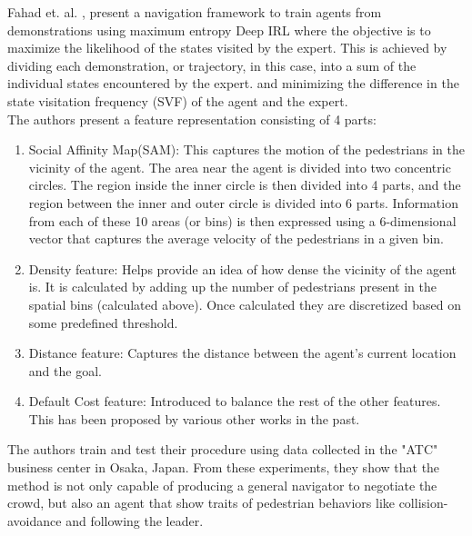 Fahad et. al. \cite{fahad_learning_2018}, present a navigation framework to train agents from demonstrations using maximum entropy Deep IRL where the objective is to maximize the likelihood of the states visited by the expert.
This is achieved by dividing each demonstration, or trajectory, in this case, into a sum of the individual states encountered by the expert. and minimizing the difference in the state visitation frequency (SVF) of the agent and the expert.\\
The authors present a feature representation consisting of 4 parts:
\begin{enumerate}
    \item Social Affinity Map(SAM): This captures the motion of the pedestrians in the vicinity of the agent. The area near the agent is divided into two concentric circles. The region inside the inner circle is then divided into 4 parts, and the region between the inner and outer circle is divided into 6 parts.
    Information from each of these 10 areas (or bins) is then expressed using a 6-dimensional vector that captures the average velocity of the pedestrians in a given bin. 
    \item Density feature: Helps provide an idea of how dense the vicinity of the agent is. It is calculated by adding up the number of pedestrians present in the spatial bins (calculated above). Once calculated they are discretized based on some predefined threshold.
    \item Distance feature: Captures the distance between the agent's current location and the goal.
    \item Default Cost feature: Introduced to balance the rest of the other features. This has been proposed by various other works in the past.
    
\end{enumerate}
The authors train and test their procedure using data collected in the "ATC" business center in Osaka, Japan.
From these experiments, they show that the method is not only capable of producing a general navigator to negotiate the crowd, but also an agent that show traits of pedestrian behaviors like collision-avoidance and following the leader.

